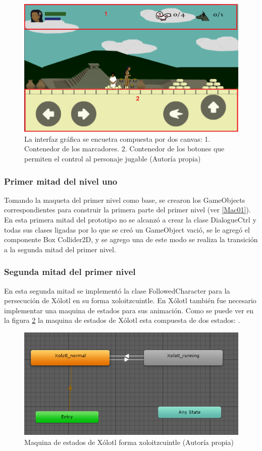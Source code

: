 \begin{figure}
  \centering
   \includegraphics[width=0.4 \textwidth]{05TrabajoRealizado/03Unity/imagenes/03Interfaz}
  \caption{La interfaz gráfica se encuetra compuesta por dos canvas: 1. Contenedor de los marcadores. 2. Contenedor de los botones que permiten el control al personaje jugable (Autoría propia)}
  \label{figCanvasM}
\end{figure}

\subsubsection{Primer mitad del nivel uno}
Tomando la maqueta del primer nivel como base, se crearon los GameObjects 
correspondientes para construir la primera parte del primer nivel (ver \ref{Mac01}). 
 En esta primera mitad del prototipo no se alcanzó a crear la clase DialogueCtrl y todas sus clases ligadas por lo que se creó un GameObject vació, se le agregó el componente Box Collider2D, y se agrego una  de este modo se realiza la transición a la segunda mitad del primer nivel.
 
 \subsubsection{Segunda mitad del primer nivel}
 En esta segunda mitad se implementó la clase FollowedCharacter para la persecución 
 de Xólotl en su forma xoloitzcuintle. En Xólotl también fue necesario implementar 
 una maquina de estados para sus animación. Como se puede ver en la figura \ref{figAniXolo} la  maquina de estados de Xólotl esta compuesta de dos estados: .
 
 \begin{figure}
  \centering
   \includegraphics[width=0.4 \textwidth]{05TrabajoRealizado/03Unity/imagenes/03MaquinaEstadosXolotl}
  \caption{Maquina de estados de Xólotl forma xoloitzcuintle (Autoría propia)}
  \label{figAniXolo}
\end{figure}